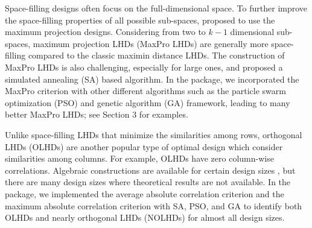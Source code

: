 Space-filling designs often focus on the full-dimensional space. To further improve the space-filling properties of all possible sub-spaces, \cite{joseph2015maximum} proposed to use the maximum projection designs. Considering from two to $k-1$ dimensional sub-spaces, maximum projection LHDs (MaxPro LHDs) are generally more space-filling compared to the classic maximin distance LHDs. The construction of MaxPro LHDs is also challenging, especially for large ones, and \cite{joseph2015maximum} proposed a simulated annealing (SA) based algorithm. In the  package, we incorporated the MaxPro criterion with other different algorithms such as the particle swarm optimization (PSO) and genetic algorithm (GA) framework, leading to many better MaxPro LHDs; see Section 3 for examples.

Unlike space-filling LHDs that minimize the similarities among rows, orthogonal LHDs (OLHDs) are another popular type of optimal design which consider similarities among columns. For example, OLHDs have zero column-wise correlations. Algebraic constructions are available for certain design sizes \citep{ye1998orthogonal, cioppa2007efficient, steinberg2006construction, sun2010construction, sun2009construction, yang2012construction, georgiou2014some, butler2001optimal, tang1993orthogonal, lin2009construction}, but there are many design sizes where theoretical results are not available. In the  package, we implemented the average absolute correlation criterion and the maximum absolute correlation criterion \citep{georgiou2009orthogonal} with SA, PSO, and GA to identify both OLHDs and nearly orthogonal LHDs (NOLHDs) for almost all design sizes.

